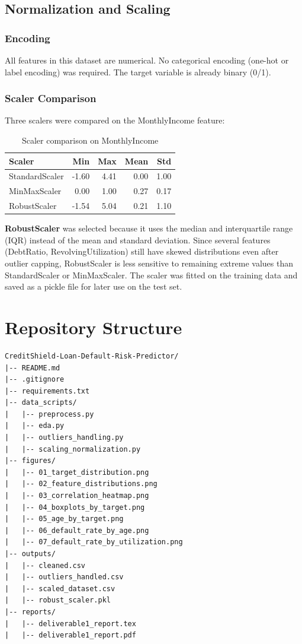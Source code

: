 \documentclass[12pt, a4paper]{article}
\begin{document}
\newpage

\subsection{Normalization and Scaling}

\subsubsection{Encoding}

All features in this dataset are numerical. No categorical encoding (one-hot or label encoding) was required. The target variable is already binary (0/1).

\subsubsection{Scaler Comparison}

Three scalers were compared on the MonthlyIncome feature:

\begin{table}[H]
\centering
\begin{tabular}{lrrrr}
\toprule
\textbf{Scaler} & \textbf{Min} & \textbf{Max} & \textbf{Mean} & \textbf{Std} \\
\midrule
StandardScaler & -1.60 & 4.41 & 0.00 & 1.00 \\
MinMaxScaler & 0.00 & 1.00 & 0.27 & 0.17 \\
RobustScaler & -1.54 & 5.04 & 0.21 & 1.10 \\
\bottomrule
\end{tabular}
\caption{Scaler comparison on MonthlyIncome}
\end{table}

\textbf{RobustScaler} was selected because it uses the median and interquartile range (IQR) instead of the mean and standard deviation. Since several features (DebtRatio, RevolvingUtilization) still have skewed distributions even after outlier capping, RobustScaler is less sensitive to remaining extreme values than StandardScaler or MinMaxScaler. The scaler was fitted on the training data and saved as a pickle file for later use on the test set.

\newpage

\section{Repository Structure}

\begin{verbatim}
CreditShield-Loan-Default-Risk-Predictor/
|-- README.md
|-- .gitignore
|-- requirements.txt
|-- data_scripts/
|   |-- preprocess.py
|   |-- eda.py
|   |-- outliers_handling.py
|   |-- scaling_normalization.py
|-- figures/
|   |-- 01_target_distribution.png
|   |-- 02_feature_distributions.png
|   |-- 03_correlation_heatmap.png
|   |-- 04_boxplots_by_target.png
|   |-- 05_age_by_target.png
|   |-- 06_default_rate_by_age.png
|   |-- 07_default_rate_by_utilization.png
|-- outputs/
|   |-- cleaned.csv
|   |-- outliers_handled.csv
|   |-- scaled_dataset.csv
|   |-- robust_scaler.pkl
|-- reports/
|   |-- deliverable1_report.tex
|   |-- deliverable1_report.pdf
\end{verbatim}
\end{document}
